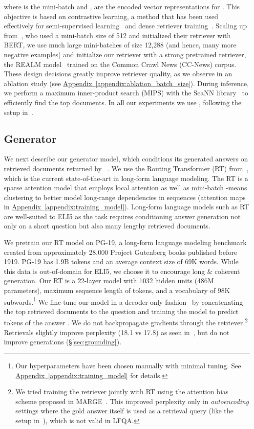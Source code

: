 \documentclass[11pt]{article}
\newcommand{\namedref}[2]{\hyperref[#2]{#1~\ref*{#2}}}
\newcommand{\appendixref}[1]{\namedref{Appendix}{#1}}
\newcommand{\retriever}[1]{\textsc{c-REALM}}
\begin{document}
where  is the mini-batch and ,  are the encoded vector representations for . This objective is based on contrastive learning, a method that has been used effectively for semi-supervised learning~\citep{chen2020simple} and dense retriever training~\citep{karpukhin2020dense}. Scaling up from~\citet{jernite2020}, who used a mini-batch size of 512 and initialized their retriever with BERT, we use much large mini-batches of size 12,288 (and hence, many more negative examples) and initialize our retriever with a strong pretrained retriever, the REALM model~\citep{guu2020realm} trained on the Common Crawl News (CC-News) corpus. These design decisions greatly improve retriever quality, as we observe in an ablation study (see \appendixref{appendix:ablation_batch_size}). During inference, we perform a maximum inner-product search (MIPS) with the ScaNN library~\citep{avq_2020} to efficiently find the top  documents. In all our experiments we use , following the setup in~\citet{guu2020realm}.

\subsection{Generator}

We next describe our generator model, which conditions its generated answers on retrieved documents returned by \retriever~. We use the Routing Transformer (RT) from~\citet{roy2020efficient}, which is the current
state-of-the-art in long-form language modeling. The RT is a sparse attention model that employs 
local attention as well as mini-batch -means clustering to better model long-range 
dependencies in sequences (attention maps in \appendixref{appendix:training_model}). Long-form language models such as RT are well-suited to ELI5 as the task requires conditioning answer generation not only on a short question but also many lengthy retrieved documents. 

We pretrain our RT model on PG-19, a long-form language
modeling benchmark~\citep{rae2020compressive} created from approximately 28,000 Project Gutenberg books published before 1919. PG-19 has 1.9B tokens and an average context size of 69K words. While this data is out-of-domain for ELI5, we choose it to encourage long \& coherent generation. Our RT is a 22-layer model with 1032 hidden units (486M parameters), maximum sequence length of  tokens, and a vocabulary of 98K subwords.\footnote{Our hyperparameters have been chosen manually with minimal tuning. See \appendixref{appendix:training_model} for details.}
We fine-tune our model in a decoder-only 
fashion~\citep{liu2018generating, wolf2019transfertransfo} by concatenating the top  retrieved documents to the question
 and training the model to predict tokens of the answer . We do not backpropagate gradients through the 
retriever.\footnote{We tried training the retriever jointly with RT using the attention bias scheme proposed in MARGE~\citep{lewis2020pre}. This 
improved perplexity only in \textit{autoencoding} settings where the gold answer itself is used as 
a retrieval query (like the setup in~\citealp{lewis2020pre}), which is not valid in LFQA.} Retrievals slightly improve perplexity (18.1 vs 17.8) as seen in~\citet{wang2020fly}, but do not improve generations (\S \ref{sec:grounding}).
\end{document}
